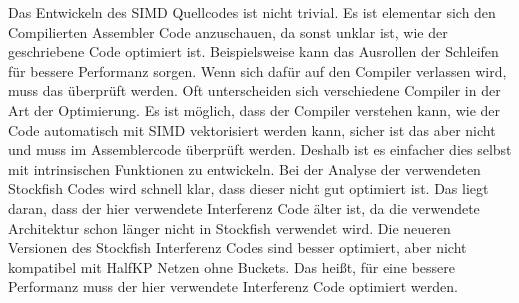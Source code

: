 Das Entwickeln des \ac{SIMD} Quellcodes ist nicht trivial. Es ist elementar sich den Compilierten Assembler Code anzuschauen, da sonst unklar ist, wie der geschriebene Code optimiert ist. Beispielsweise kann das Ausrollen der Schleifen für bessere Performanz sorgen. Wenn sich dafür auf den Compiler verlassen wird, muss das überprüft werden. Oft unterscheiden sich verschiedene Compiler in der Art der Optimierung. Es ist möglich, dass der Compiler verstehen kann, wie der Code automatisch mit \ac{SIMD} vektorisiert werden kann, sicher ist das aber nicht und muss im Assemblercode überprüft werden. Deshalb ist es einfacher dies selbst mit intrinsischen Funktionen zu entwickeln. Bei der Analyse der verwendeten Stockfish Codes wird schnell klar, dass dieser nicht gut optimiert ist. Das liegt daran, dass der hier verwendete Interferenz Code älter ist, da die verwendete Architektur schon länger nicht in Stockfish verwendet wird. Die neueren Versionen des Stockfish Interferenz Codes sind besser optimiert, aber nicht kompatibel mit HalfKP Netzen ohne Buckets. Das heißt, für eine bessere Performanz muss der hier verwendete Interferenz Code optimiert werden.